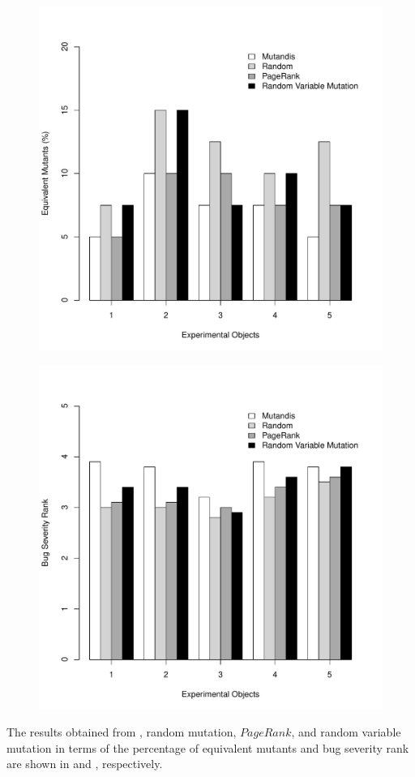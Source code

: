 \begin{figure}[!t]
  \centering
  \includegraphics[width=0.6\hsize]{r-scripts/equivMuts-barPlot}
  \vspace{0.09in} 
  \label{Fig:equivMuts-barPlot}
\end{figure}

\begin{figure}[!t]
  \centering
  \includegraphics[width=0.6\hsize]{r-scripts/bugSeverity-barPlot}
  \vspace{0.09in} 
  \label{Fig:bugSeverity-barPlot}
\end{figure}

 \label{Sec:eval-comparison}

The results obtained from \mutandis, random mutation, $PageRank$, and random variable mutation %
 in terms of the percentage of equivalent mutants and bug severity rank are shown in  and , respectively.



